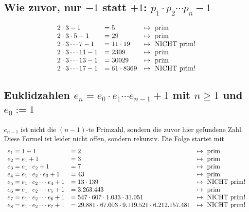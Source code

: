 \begin{refsegment}
\subsection{Wie zuvor, nur \texorpdfstring{$-1$ statt $+1$: $p_1 \cdot p_2 \cdots p_n -1$}{-1 statt +1: p\_1 ... p\_2 ... p\_n -1}}
$$
 \begin{array}{lll}
2\cdot 3 -1     &   = 5 &   \mapsto {\rm ~prim} \\
2\cdot 3 \cdot  5  -1   &   = 29 &  \mapsto {\rm ~prim} \\
2\cdot 3 \cdots 7  -1   &   = 11 \cdot 19 & \mapsto {\rm ~NICHT~prim} ! \\
2\cdot 3 \cdots 11 -1   &   = 2309 &    \mapsto {\rm ~prim} \\
2\cdot 3 \cdots 13 -1  &    = 30029 &   \mapsto {\rm ~prim} \\
2\cdot 3 \cdots 17 -1    &  = 61 \cdot 8369 &   \mapsto {\rm ~NICHT~prim!}
\end{array}
$$


\subsection[Euklidzahlen \texorpdfstring{$e_n = e_0 \cdot e_1 \cdots e_{n-1} + 1$}{e\_n = e\_0 ... e\_1 ... e\_n-1 + 1}]
              {Euklidzahlen $e_n = e_0 \cdot e_1 \cdots e_{n-1} + 1$
	       mit $ n \geq 1 $ und $ e_0 := 1 $}
    $e_{n-1}$ ist nicht die $(n-1)$-te Primzahl, sondern die zuvor hier
    gefundene Zahl.
    Diese Formel ist leider nicht offen, sondern rekursiv.
    Die Folge startet mit
$$
\begin{array}{lll}
e_1 = 1 + 1 &   = 2 &   \mapsto {\rm ~prim} \\
e_2 = e_1 + 1   &   = 3 &   \mapsto {\rm ~prim} \\
e_3 = e_1 \cdot e_2 + 1 &   = 7 &   \mapsto {\rm ~prim} \\
e_4 = e_1 \cdot e_2 \cdot e_3 + 1 & = 43 &  \mapsto {\rm ~prim} \\
e_5 = e_1 \cdot e_2 \cdots e_4 + 1 &    = 13 \cdot 139 &    \mapsto {\rm ~NICHT~prim} ! \\
e_6 = e_1 \cdot e_2 \cdots e_5 + 1 &    = 3.263.443 &   \mapsto {\rm ~prim} \\
e_7 = e_1 \cdot e_2 \cdots e_6 + 1 &    = 547 \cdot 607 \cdot 1.033 \cdot 31.051 & \mapsto {\rm ~NICHT~prim} ! \\
e_8 = e_1 \cdot e_2 \cdots e_7 + 1 &    = 29.881\cdot 67.003 \cdot 9.119.521 \cdot 6.212.157.481 & \mapsto {\rm ~NICHT~prim} !
\end{array}
$$


\end{refsegment}
